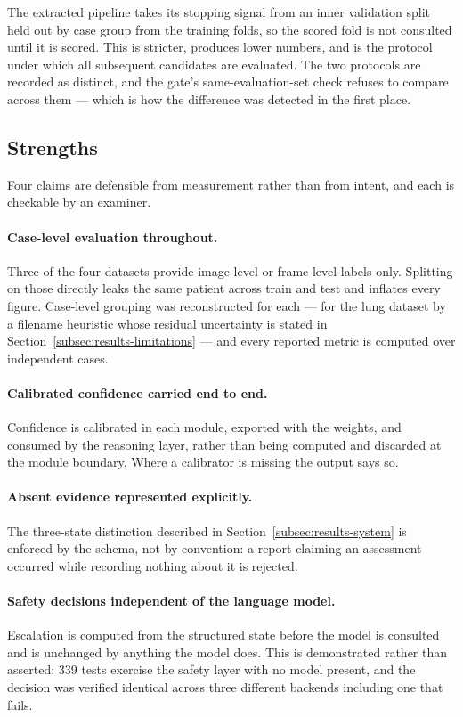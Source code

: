 The extracted pipeline takes its stopping signal from an inner validation split held out by
case group from the training folds, so the scored fold is not consulted until it is scored.
This is stricter, produces lower numbers, and is the protocol under which all subsequent
candidates are evaluated. The two protocols are recorded as distinct, and the gate's
same-evaluation-set check refuses to compare across them --- which is how the difference was
detected in the first place.

\subsection{Strengths}
\label{subsec:results-strengths}

Four claims are defensible from measurement rather than from intent, and each is checkable by
an examiner.

\paragraph{Case-level evaluation throughout.} Three of the four datasets provide image-level
or frame-level labels only. Splitting on those directly leaks the same patient across train
and test and inflates every figure. Case-level grouping was reconstructed for each --- for the
lung dataset by a filename heuristic whose residual uncertainty is stated in
Section~\ref{subsec:results-limitations} --- and every reported metric is computed over
independent cases.

\paragraph{Calibrated confidence carried end to end.} Confidence is calibrated in each module,
exported with the weights, and consumed by the reasoning layer, rather than being computed and
discarded at the module boundary. Where a calibrator is missing the output says so.

\paragraph{Absent evidence represented explicitly.} The three-state distinction described in
Section~\ref{subsec:results-system} is enforced by the schema, not by convention: a report
claiming an assessment occurred while recording nothing about it is rejected.

\paragraph{Safety decisions independent of the language model.} Escalation is computed from
the structured state before the model is consulted and is unchanged by anything the model
does. This is demonstrated rather than asserted: 339 tests exercise the safety layer with no
model present, and the decision was verified identical across three different backends
including one that fails.


